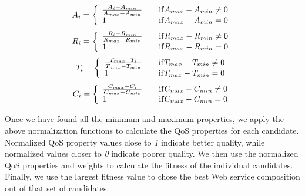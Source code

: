 \[A_i = \left\{
\begin{array}{l l} 
    \frac{A_i - A_{min}}{A_{max} - A_{min}}      & \quad \mathrm{if } A_{max} - A_{min} \neq 0\\
    1  & \quad \mathrm{if } A_{max} - A_{min} = 0\\
\end{array} \right. \]\label{eq:2}
\[R_i = \left\{
\begin{array}{l l} 
    \frac{R_i - R_{min}}{R_{max} - R_{min}}      & \quad \mathrm{if } R_{max} - R_{min} \neq 0\\
    1  & \quad \mathrm{if } R_{max} - R_{min} = 0\\
\end{array} \right. \]\label{eq:2}
\[T_i = \left\{
\begin{array}{l l} 
    \frac{T_{max} - T_i}{T_{max} - T_{min}}      & \quad \mathrm{if } T_{max} - T_{min} \neq 0\\
    1  & \quad \mathrm{if } T_{max} - T_{min} = 0\\
\end{array} \right. \]\label{eq:2}
\[C_i = \left\{
\begin{array}{l l} 
    \frac{C_{max} - C_i}{C_{max} - C_{min}}      & \quad \mathrm{if } C_{max} - C_{min} \neq 0\\
    1  & \quad \mathrm{if } C_{max} - C_{min} = 0\\
\end{array} \right. \]\label{eq:2}

Once we have found all the minimum and maximum properties, we apply the above normalization functions to calculate the QoS properties for each candidate. Normalized QoS property values close to \emph{1} indicate better quality, while normalized values closer to \emph{0} indicate poorer quality. We then use the normalized QoS properties and weights to calculate the fitness of the individual candidates. Finally, we use the largest fitness value to chose the best Web service composition out of that set of candidates. 